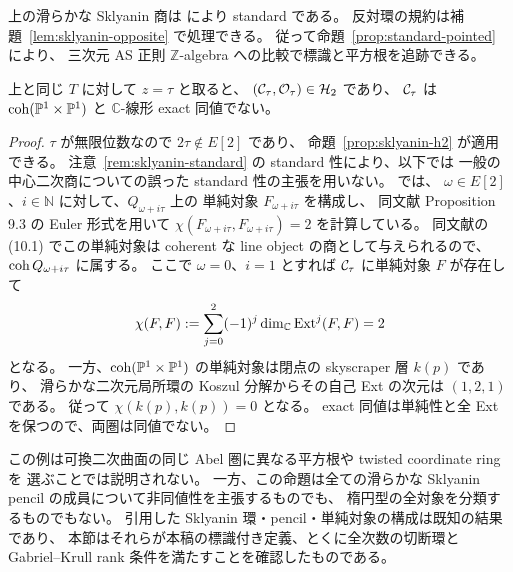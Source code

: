 \begin{remark}
\label{rem:sklyanin-standard}
上の滑らかな Sklyanin 商は \cite[Theorem 5.5]{MUW2026} により standard である。
反対環の規約は補題~\ref{lem:sklyanin-opposite} で処理できる。
従って命題~\ref{prop:standard-pointed} により、
三次元 AS 正則 $\mathbb Z$-algebra への比較で標識と平方根を追跡できる。
\end{remark}

\begin{proposition}[可換二次曲面と同値でない対象]
\label{prop:sklyanin-genuinely-noncommutative}
上と同じ $T$ に対して $z=\tau$ と取ると、
$(\mathcal C_\tau,\mathcal O_\tau)\in\mathcal H_2$ であり、
$\mathcal C_\tau$ は $\operatorname{coh}(\mathbb P^1\times\mathbb P^1)$ と $\mathbb C$-線形 exact 同値でない。
\end{proposition}

\begin{proof}
$\tau$ が無限位数なので $2\tau\notin E[2]$ であり、
命題~\ref{prop:sklyanin-h2} が適用できる。
注意~\ref{rem:sklyanin-standard} の standard 性により、以下では
一般の中心二次商についての誤った standard 性の主張を用いない。
\cite[\S 10.5, p.~854]{SVdB2013} では、
$\omega\in E[2]$、$i\in\mathbb N$ に対して、$Q_{\omega+i\tau}$ 上の
単純対象 $F_{\omega+i\tau}$ を構成し、
同文献 Proposition 9.3 の Euler 形式を用いて
$\chi(F_{\omega+i\tau},F_{\omega+i\tau})=2$ を計算している。
同文献の (10.1) でこの単純対象は coherent な line object の商として与えられるので、
$\operatorname{coh} Q_{\omega+i\tau}$ に属する。
ここで $\omega=0$、$i=1$ とすれば $\mathcal C_\tau$ に単純対象 $F$ が存在して
\[
 \chi(F,F):=\sum_{j=0}^2(-1)^j\dim_{\mathbb C}\operatorname{Ext}^j(F,F)=2
\]
となる。
一方、$\operatorname{coh}(\mathbb P^1\times\mathbb P^1)$ の単純対象は閉点の skyscraper 層 $k(p)$ であり、
滑らかな二次元局所環の Koszul 分解からその自己 Ext の次元は $(1,2,1)$ である。
従って $\chi(k(p),k(p))=0$ となる。
exact 同値は単純性と全 Ext を保つので、両圏は同値でない。
\end{proof}

この例は可換二次曲面の同じ Abel 圏に異なる平方根や twisted coordinate ring を
選ぶことでは説明されない。
一方、この命題は全ての滑らかな Sklyanin pencil の成員について非同値性を主張するものでも、
楕円型の全対象を分類するものでもない。
引用した Sklyanin 環・pencil・単純対象の構成は既知の結果であり、
本節はそれらが本稿の標識付き定義、とくに全次数の切断環と
Gabriel--Krull rank 条件を満たすことを確認したものである。
